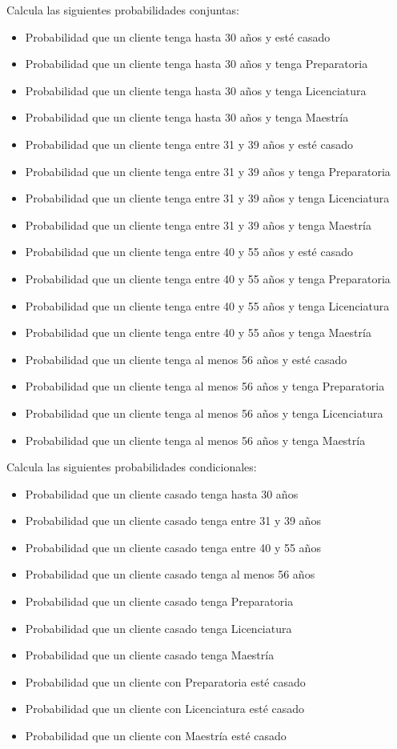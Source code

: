 \documentclass{article}
\begin{document}
Calcula las siguientes probabilidades conjuntas:
\begin{itemize}
    \item Probabilidad que un cliente tenga hasta 30 años y esté casado
    \item Probabilidad que un cliente tenga hasta 30 años y tenga Preparatoria
    \item Probabilidad que un cliente tenga hasta 30 años y tenga Licenciatura
    \item Probabilidad que un cliente tenga hasta 30 años y tenga Maestría
    \item Probabilidad que un cliente tenga entre 31 y 39 años y esté casado
    \item Probabilidad que un cliente tenga entre 31 y 39 años y tenga Preparatoria
    \item Probabilidad que un cliente tenga entre 31 y 39 años y tenga Licenciatura
    \item Probabilidad que un cliente tenga entre 31 y 39 años y tenga Maestría
    \item Probabilidad que un cliente tenga entre 40 y 55 años y esté casado
    \item Probabilidad que un cliente tenga entre 40 y 55 años y tenga Preparatoria
    \item Probabilidad que un cliente tenga entre 40 y 55 años y tenga Licenciatura
    \item Probabilidad que un cliente tenga entre 40 y 55 años y tenga Maestría
    \item Probabilidad que un cliente tenga al menos 56 años y esté casado
    \item Probabilidad que un cliente tenga al menos 56 años y tenga Preparatoria
    \item Probabilidad que un cliente tenga al menos 56 años y tenga Licenciatura
    \item Probabilidad que un cliente tenga al menos 56 años y tenga Maestría
\end{itemize}
Calcula las siguientes probabilidades condicionales:
\begin{itemize}
    \item Probabilidad que un cliente casado tenga hasta 30 años
    \item Probabilidad que un cliente casado tenga entre 31 y 39 años
    \item Probabilidad que un cliente casado tenga entre 40 y 55 años
    \item Probabilidad que un cliente casado tenga al menos 56 años
    \item Probabilidad que un cliente casado tenga Preparatoria
    \item Probabilidad que un cliente casado tenga Licenciatura
    \item Probabilidad que un cliente casado tenga Maestría
    \item Probabilidad que un cliente con Preparatoria esté casado
    \item Probabilidad que un cliente con Licenciatura esté casado
    \item Probabilidad que un cliente con Maestría esté casado
\end{itemize}
\end{document}
